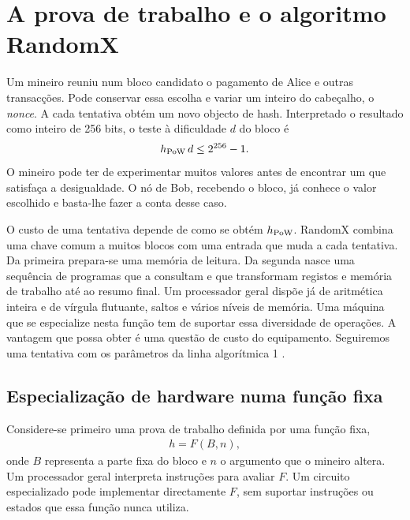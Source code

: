 \chapter{A prova de trabalho e o algoritmo RandomX}
\label{chapter:randomx}
\label{page:randomx-start}

Um mineiro reuniu num bloco candidato o pagamento de Alice e outras
transacções. Pode conservar essa escolha e variar um inteiro do
cabeçalho, o \emph{nonce}. A cada tentativa obtém um novo objecto
de hash. Interpretado o resultado como inteiro de 256 bits,
o teste à dificuldade \(d\) do bloco é
\begin{align}
 h_{\rm PoW}\,d\leq 2^{256}-1.
 \label{eq:randomx-difficulty-check}
\end{align}
O mineiro pode ter de experimentar muitos valores antes de encontrar
um que satisfaça a desigualdade. O nó de Bob, recebendo o bloco,
já conhece o valor escolhido e basta-lhe fazer a conta desse caso.

O custo de uma tentativa depende de como se obtém \(h_{\rm PoW}\).
RandomX combina uma chave comum a muitos blocos com uma entrada que
muda a cada tentativa. Da primeira prepara-se uma memória de leitura.
Da segunda nasce uma sequência de programas que a consultam e que
transformam registos e memória de trabalho até ao resumo final.
Um processador geral dispõe já de aritmética inteira e de vírgula
flutuante, saltos e vários níveis de memória. Uma máquina que se
especialize nesta função tem de suportar essa diversidade de
operações. A vantagem que possa obter é uma questão de custo do
equipamento. Seguiremos uma tentativa com os parâmetros da linha
algorítmica 1 \cite{monero-source-v16,randomx-spec-v1,randomx-design-v1}.

\section{Especialização de hardware numa função fixa}
\label{sec:randomx-fixed-work}

Considere-se primeiro uma prova de trabalho definida por uma função fixa,
\begin{align*}
 h=F(B,n),
\end{align*}
onde \(B\) representa a parte fixa do bloco e \(n\) o argumento que o mineiro
altera. Um processador geral interpreta instruções para avaliar \(F\). Um
circuito especializado pode implementar directamente \(F\), sem suportar
instruções ou estados que essa função nunca utiliza.

